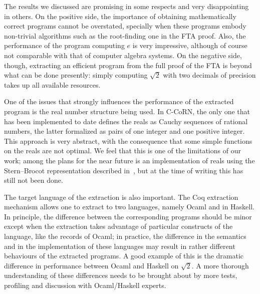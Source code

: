 \documentclass{entcs}
\begin{document}
The results we discussed are promising
in some respects and very disappointing in others.  On the positive side,
the importance of obtaining mathematically correct programs
cannot be overstated, specially when these programs
embody non-trivial algorithms such as the root-finding one
in the FTA proof.  Also, the performance of the program computing $e$ is
very impressive, although of course not comparable with that of computer
algebra systems.
%
On the negative side, though, extracting an efficient program from the
full proof of the FTA is beyond what can be
done presently: simply computing $\sqrt2$ with two decimals
of precision takes up all available resources.

One of the issues that strongly influences the performance of the extracted
program is the real number structure being used.
In
C-CoRN, the only one that has been implemented to date
defines the reals as Cauchy sequences of rational numbers,
the latter formalized
as pairs of one integer and one positive integer.  This approach is
very abstract, with the consequence that some simple functions on the
reals are not optimal.
We feel that this is one of the limitations of our work; 
among the plans for the near future is an implementation of reals using
the Stern--Brocot representation described in~\cite{niq:ber:04}, but at the
time of writing this has still not been done.

The target language of the extraction is also important.
The Coq extraction mechanism allows one to extract to two languages,
namely Ocaml and in Haskell. In principle,
the difference between the corresponding programs should be minor except when
the extraction takes advantage of particular constructs of
the language, like the records of Ocaml; in practice, the
difference in the semantics and in the implementation of these
languages may result in rather different behaviours of the extracted programs.
A good example of this is
the dramatic difference in performance between Ocaml and Haskell on
$\sqrt{2}$.
A more thorough understanding of these differences needs to be brought
about by more tests,
profiling and discussion with Ocaml/Haskell experts.
\end{document}

